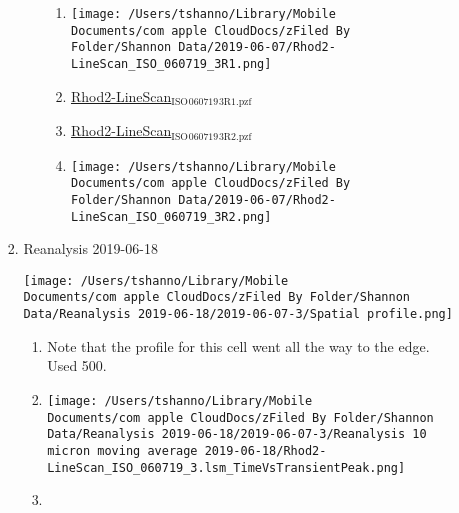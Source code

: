 \documentclass[11pt]{article}
\begin{document}
\begin{enumerate}
\begin{enumerate}
\begin{enumerate}
\begin{enumerate}
\label{sec:org07dd319}
\begin{enumerate}
\item \begin{center}
\texttt{[image: /Users/tshanno/Library/Mobile Documents/com~apple~CloudDocs/zFiled By Folder/Shannon Data/2019-06-07/Rhod2-LineScan\_ISO\_060719\_3R1.png]}
\end{center}
\label{sec:org4946498}
\item \href{file:///Users/tshanno/Library/Mobile Documents/com\~apple\~CloudDocs/zFiled By Folder/Shannon Data/2019-06-07/Rhod2-LineScan\_ISO\_060719\_3R1.pzf}{Rhod2-LineScan\(_{\text{ISO}}\)\(_{\text{060719}}\)\(_{\text{3R1.pzf}}\)}
\label{sec:org41a5947}
\item \href{file:///Users/tshanno/Library/Mobile Documents/com\~apple\~CloudDocs/zFiled By Folder/Shannon Data/2019-06-07/Rhod2-LineScan\_ISO\_060719\_3R2.pzf}{Rhod2-LineScan\(_{\text{ISO}}\)\(_{\text{060719}}\)\(_{\text{3R2.pzf}}\)}
\label{sec:org126e9a4}
\item \begin{center}
\texttt{[image: /Users/tshanno/Library/Mobile Documents/com~apple~CloudDocs/zFiled By Folder/Shannon Data/2019-06-07/Rhod2-LineScan\_ISO\_060719\_3R2.png]}
\end{center}
\label{sec:orgf6ca89c}
\end{enumerate}
\end{enumerate}
\item Reanalysis 2019-06-18
\label{sec:org6002b55}
\begin{center}
\texttt{[image: /Users/tshanno/Library/Mobile Documents/com~apple~CloudDocs/zFiled By Folder/Shannon Data/Reanalysis 2019-06-18/2019-06-07-3/Spatial profile.png]}
\end{center}
\begin{enumerate}
\item Note that the profile for this cell went all the way to the edge.  Used 500.
\label{sec:org72f01db}
\item \begin{center}
\texttt{[image: /Users/tshanno/Library/Mobile Documents/com~apple~CloudDocs/zFiled By Folder/Shannon Data/Reanalysis 2019-06-18/2019-06-07-3/Reanalysis 10 micron moving average 2019-06-18/Rhod2-LineScan\_ISO\_060719\_3.lsm\_TimeVsTransientPeak.png]}
\end{center}
\label{sec:orgfcdc4bc}
\item \begin{center}

\end{center}
\end{enumerate}
\end{enumerate}
\end{enumerate}
\end{enumerate}
\end{document}
